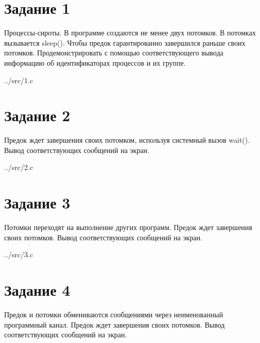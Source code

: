 \section*{Задание 1}

Процессы-сироты. В программе создаются не менее двух потомков. В потомках вызывается {\ttfamily sleep()}. Чтобы предок гарантированно завершился
раньше своих потомков. Продемонстрировать с помощью соответствующего вывода информацию об идентификаторах процессов и их группе.

\begin{lstinputlisting}[
	caption={Рекурсивный},
	style={go},
	]{../src/1.c}
\end{lstinputlisting}


\section*{Задание 2}

Предок ждет завершения своих потомком, используя системный вызов
{\ttfamily wait()}. Вывод соответствующих сообщений на экран.

\begin{lstinputlisting}[
	caption={wait()},
	style={go},
	]{../src/2.c}
\end{lstinputlisting}


\section*{Задание 3}

Потомки переходят на выполнение других программ. Предок ждет завершения своих потомков. Вывод соответствующих сообщений на экран.

\begin{lstinputlisting}[
	caption={execlp()},
	style={go},
	]{../src/3.c}
\end{lstinputlisting}


\section*{Задание 4}

Предок и потомки обмениваются сообщениями через неименованный программный канал. Предок ждет завершения своих потомков. Вывод соответствующих сообщений на экран.

